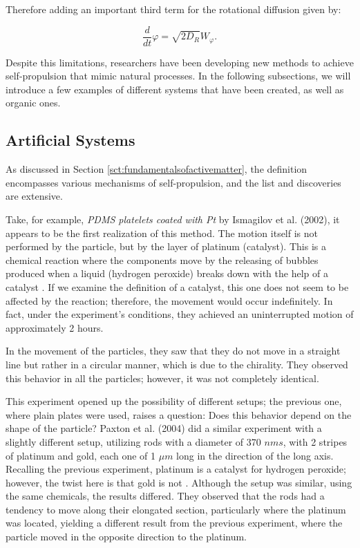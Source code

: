 Therefore adding an important third term for the rotational diffusion given by:

\begin{equation}
  \frac{d}{dt}{\varphi} = \sqrt{2D_R}W _{\varphi}.
  \label{eq:rotationaldiffusion}
\end{equation}


Despite this limitations, researchers have been developing new methods to achieve self-propulsion that mimic natural processes. In the following subsections, we will introduce a few examples of different systems that have been created, as well as organic ones.


\subsection{Artificial Systems}

As discussed in Section \ref{sct:fundamentalsofactivematter}, the definition encompasses various mechanisms of self-propulsion, and the list and discoveries are extensive.

Take, for example, \textit{PDMS platelets coated with Pt} by Ismagilov et al. (2002), it appears to be the first realization of this method. The motion itself is not performed by the particle, but by the layer of platinum (catalyst). This is a chemical reaction where the components move by the releasing of bubbles produced when a liquid (hydrogen peroxide) breaks down with the help of a catalyst \cite{ismagilov2002autonomous}. If we examine the definition of a catalyst, this one does not seem to be affected by the reaction; therefore, the movement would occur indefinitely. In fact, under the experiment's conditions, they achieved an uninterrupted motion of approximately 2 hours. 

In the movement of the particles, they saw that they do not move in a straight line but rather in a circular manner, which is due to the chirality. They observed this behavior in all the particles; however, it was not completely identical.  


This experiment opened up the possibility of different setups; the previous one, where plain plates were used, raises a question: Does this behavior depend on the shape of the particle? Paxton et al. (2004) did a similar experiment with a slightly different setup, utilizing rods with a diameter of  370 $nms$, with 2 stripes of platinum and gold, each one of 1 $\mu m$ long in the direction of the long axis. Recalling the previous experiment, platinum is a catalyst for hydrogen peroxide; however, the twist here is that gold is not \cite{paxton2004catalytic}. Although the setup was similar, using the same chemicals, the results differed. They observed that the rods had a tendency to move along their elongated section, particularly where the platinum was located, yielding a different result from the previous experiment, where the particle moved in the opposite direction to the platinum.

